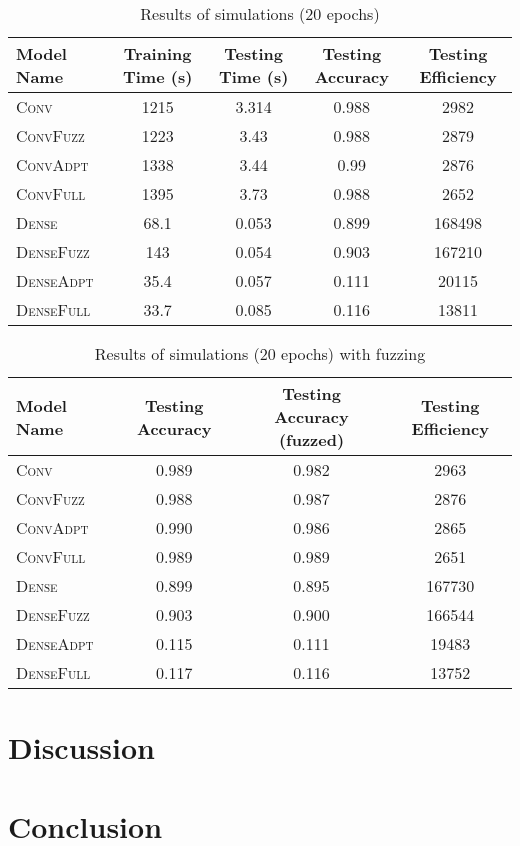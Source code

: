 \documentclass{article}
\begin{document}
\begin{table}[h]
  \caption{Results of simulations (20 epochs)}
  \label{tbl:results3}
  \centering
  \begin{tabular}{lSSSS}
    \toprule
    {Model Name} & {Training Time (s)} & {Testing Time (s)} & {Testing Accuracy} & {Testing Efficiency} \\
    \midrule
    {\textsc{Conv}}         & 1215 & 3.314 & 0.988 & 2982 \\
    {\textsc{ConvFuzz}}     & 1223 & 3.43 & 0.988 & 2879 \\
    {\textsc{ConvAdpt}}     & 1338 & 3.44 & 0.99 & 2876 \\
    {\textsc{ConvFull}}     & 1395 & 3.73 & 0.988 & 2652 \\
    {\textsc{Dense}}        & 68.1 & 0.053 & 0.899 & 168498 \\
    {\textsc{DenseFuzz}}    & 143 & 0.054 & 0.903 & 167210 \\
    {\textsc{DenseAdpt}}    & 35.4 & 0.057 & 0.111 & 20115 \\
    {\textsc{DenseFull}}    & 33.7 & 0.085 & 0.116 & 13811 \\
    \bottomrule
  \end{tabular}
\end{table}

\begin{table}[h]
  \caption{Results of simulations (20 epochs) with fuzzing}
  \label{tbl:results4}
  \centering
  \begin{tabular}{lSSS}
    \toprule
    {Model Name} & {Testing Accuracy} & {Testing Accuracy (fuzzed)} & {Testing Efficiency} \\
    \midrule
    {\textsc{Conv}}         & 0.989 & 0.982 & 2963 \\
    {\textsc{ConvFuzz}}     & 0.988 & 0.987 & 2876 \\
    {\textsc{ConvAdpt}}     & 0.990 & 0.986 & 2865 \\
    {\textsc{ConvFull}}     & 0.989 & 0.989 & 2651 \\
    {\textsc{Dense}}        & 0.899 & 0.895 & 167730 \\
    {\textsc{DenseFuzz}}    & 0.903 & 0.900 & 166544 \\
    {\textsc{DenseAdpt}}    & 0.115 & 0.111 & 19483 \\
    {\textsc{DenseFull}}    & 0.117 & 0.116 & 13752 \\
    \bottomrule
  \end{tabular}
\end{table}

\section{Discussion}

\section{Conclusion}


\end{document}
